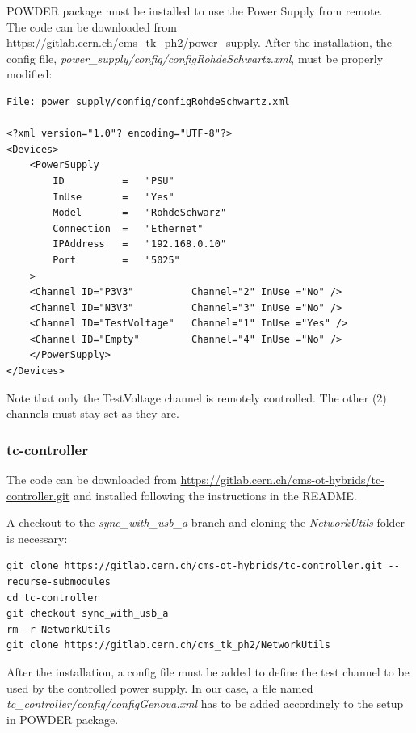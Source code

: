 \documentclass[10pt,a4paper]{article}
\begin{document}
POWDER package must be installed to use the Power Supply from remote. \\
The code can be downloaded from \url{https://gitlab.cern.ch/cms_tk_ph2/power_supply}.
After the installation, the config file, \emph{power\_supply/config/configRohdeSchwartz.xml}, must be properly modified:
\begin{framed}
\begin{verbatim}
File: power_supply/config/configRohdeSchwartz.xml

<?xml version="1.0"? encoding="UTF-8"?>
<Devices>
    <PowerSupply
        ID          =   "PSU"
        InUse       =   "Yes"
        Model       =   "RohdeSchwarz"
        Connection  =   "Ethernet"
        IPAddress   =   "192.168.0.10"
        Port        =   "5025"
    >
    <Channel ID="P3V3"          Channel="2" InUse ="No" />
    <Channel ID="N3V3"          Channel="3" InUse ="No" />
    <Channel ID="TestVoltage"   Channel="1" InUse ="Yes" />
    <Channel ID="Empty"         Channel="4" InUse ="No" />
    </PowerSupply>
</Devices>

\end{verbatim}
\end{framed}
Note that only the TestVoltage channel is remotely controlled. The other (2) channels must stay set as they are.

\subsubsection{tc-controller}
\label{tc-controller}

The code can be downloaded from \url{https://gitlab.cern.ch/cms-ot-hybrids/tc-controller.git} and installed following the instructions in the README.

A checkout to the \emph{sync\_with\_usb\_a} branch and cloning the \emph{NetworkUtils} folder is necessary:

\begin{framed}
\begin{verbatim}
git clone https://gitlab.cern.ch/cms-ot-hybrids/tc-controller.git --recurse-submodules
cd tc-controller
git checkout sync_with_usb_a
rm -r NetworkUtils
git clone https://gitlab.cern.ch/cms_tk_ph2/NetworkUtils
\end{verbatim}
\end{framed}

After the installation, a config file must be added to define the test channel to be used by the controlled power supply.
In our case, a file named {\it tc\_controller/config/configGenova.xml} has to be added accordingly to the setup in POWDER package.
\end{document}
